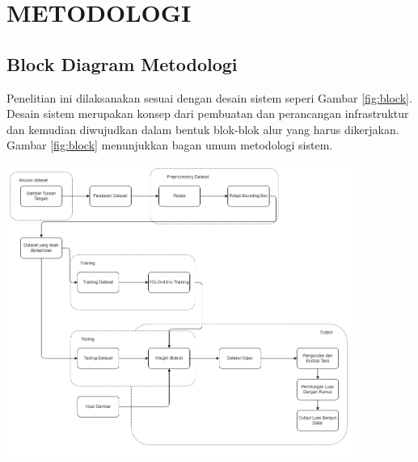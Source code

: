 \chapter{METODOLOGI}
\label{chap:metodologi}
\section{Block Diagram Metodologi}
Penelitian ini dilaksanakan sesuai dengan desain sistem seperi Gambar \ref{fig:block}. Desain sistem merupakan konsep dari
pembuatan dan perancangan infrastruktur dan kemudian diwujudkan dalam bentuk blok-blok alur yang harus dikerjakan. Gambar \ref{fig:block} menunjukkan bagan umum metodologi sistem.
\setlength{\belowcaptionskip}{-5pt}
\begin{center}
	\includegraphics[width=0.85\textwidth]{gambar/block diagram baru.png}
	\label{fig:block}
\end{center}

